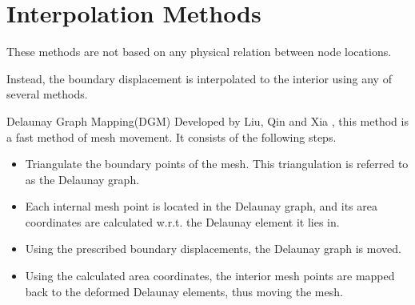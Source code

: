 \documentclass[mathserif]{beamer}
\begin{document}
\section{Interpolation Methods}
\begin{frame}
These methods are not based on any physical relation between node locations.

Instead, the boundary displacement is interpolated to the interior using any of several methods.
\end{frame}

\begin{frame}{Delaunay Graph Mapping(DGM)}
Developed by Liu, Qin and Xia \cite{dgm}, this method is a fast method of mesh movement. It consists of the following steps.
\begin{itemize}
\item Triangulate the boundary points of the mesh. This triangulation is referred to as the Delaunay graph.
\item Each internal mesh point is located in the Delaunay graph, and its area coordinates are calculated w.r.t. the Delaunay element it lies in.
\item Using the prescribed boundary displacements, the Delaunay graph is moved.
\item Using the calculated area coordinates, the interior mesh points are mapped back to the deformed Delaunay elements, thus moving the mesh.
\end{itemize}
\end{frame}
\end{document}
